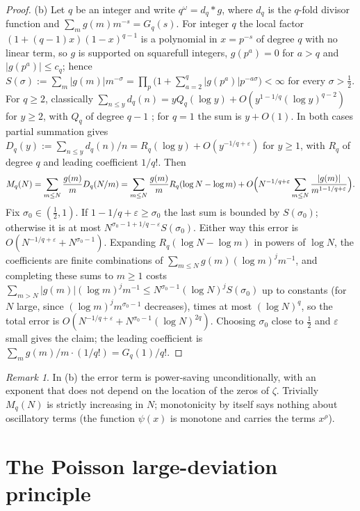 \documentclass[11pt]{amsart}
\theoremstyle{definition}
\theoremstyle{remark}
\newtheorem{remark}[theorem]{Remark}
\newcommand{\half}{\tfrac12}
\newcommand{\om}{\omega}
\begin{document}
\begin{proof}
  (b) Let $q$ be an integer and write $q^{\om}=d_q*g$, where $d_q$ is the $q$-fold divisor
  function and $\sum_mg(m)m^{-s}=G_q(s)$.  For integer $q$ the local factor
  $(1+(q-1)x)(1-x)^{q-1}$ is a polynomial in $x=p^{-s}$ of degree $q$ with no linear term,
  so $g$ is supported on squarefull integers, $g(p^a)=0$ for $a>q$ and $|g(p^a)|\le c_q$;
  hence $S(\sigma):=\sum_m|g(m)|m^{-\sigma}=\prod_p\bigl(1+\sum_{a=2}^q|g(p^a)|p^{-a\sigma}\bigr)
  <\infty$ for every $\sigma>\half$.  For $q\ge2$, classically
  $\sum_{n\le y}d_q(n)=yQ_q(\log y)+O(y^{1-1/q}(\log y)^{q-2})$ for $y\ge2$, with $Q_q$ of
  degree $q-1$ \cite[\S12.1]{Ti}; for $q=1$ the sum is $y+O(1)$.  In both cases partial summation gives
  $D_q(y):=\sum_{n\le y}d_q(n)/n=R_q(\log y)+O(y^{-1/q+\varepsilon})$ for $y\ge1$, with
  $R_q$ of degree $q$ and leading coefficient $1/q!$.  Then
  \[
    M_q(N)=\sum_{m\le N}\frac{g(m)}{m}D_q(N/m)
    =\sum_{m\le N}\frac{g(m)}{m}R_q(\log N-\log m)
     +O\Bigl(N^{-1/q+\varepsilon}\sum_{m\le N}\frac{|g(m)|}{m^{1-1/q+\varepsilon}}\Bigr).
  \]
  Fix $\sigma_0\in(\half,1)$.  If $1-1/q+\varepsilon\ge\sigma_0$ the last sum is bounded
  by $S(\sigma_0)$; otherwise it is at most
  $N^{\sigma_0-1+1/q-\varepsilon}S(\sigma_0)$.  Either way this error is
  $O(N^{-1/q+\varepsilon}+N^{\sigma_0-1})$.  Expanding $R_q(\log N-\log m)$ in powers of
  $\log N$, the coefficients are finite combinations of
  $\sum_{m\le N}g(m)(\log m)^jm^{-1}$, and completing these sums to $m\ge1$ costs
  $\sum_{m>N}|g(m)|(\log m)^jm^{-1}\le N^{\sigma_0-1}(\log N)^{j}S(\sigma_0)$ up to
  constants (for $N$ large, since $(\log m)^jm^{\sigma_0-1}$ decreases), times at most
  $(\log N)^{q}$, so the total error is $O(N^{-1/q+\varepsilon}+N^{\sigma_0-1}(\log N)^{2q})$.
  Choosing $\sigma_0$ close to $\half$ and $\varepsilon$ small gives the
  claim; the leading coefficient is $\sum_mg(m)/m\cdot(1/q!)=G_q(1)/q!$.
\end{proof}

\begin{remark}
  In (b) the error term is power-saving unconditionally, with an exponent that does not
  depend on the location of the zeros of $\zeta$.  Trivially $M_q(N)$ is strictly
  increasing in $N$; monotonicity by itself says nothing about oscillatory terms (the
  function $\psi(x)$ is monotone and carries the terms $x^\rho$).
\end{remark}

\section{The Poisson large-deviation principle}
\label{sec:LD}
\end{document}
